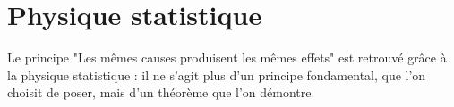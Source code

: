 
\section{Physique statistique}

Le principe "Les mêmes causes produisent les mêmes effets" est retrouvé grâce à la physique statistique : il ne s'agit plus d'un principe fondamental, que l'on choisit de poser, mais d'un théorème que l'on démontre. 
